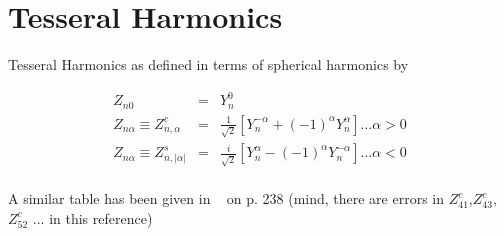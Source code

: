 \section{Tesseral Harmonics}\label{tesseral}

Tesseral Harmonics as defined in terms of spherical harmonics by

\begin{eqnarray}
Z_{n0}&=&Y_n^0 \\
Z_{n\alpha}\equiv Z_{n,\alpha}^c&=&\frac{1}{\sqrt{2}}[Y_n^{-\alpha}+(-1)^{\alpha}Y_n^{\alpha}] \dots \alpha>0 \\
Z_{n\alpha}\equiv Z_{n,|\alpha|}^s&=&\frac{i}{\sqrt{2}}[Y_n^{\alpha}-(-1)^{\alpha}Y_n^{-\alpha}] \dots \alpha<0 \\
\end{eqnarray}

A similar table has been given in ~\cite{goerrler96-121} on p. 238 (mind, there are errors in $Z^c_{41}$,$Z^c_{43}$,$Z^c_{52}$ %
... in this reference)

